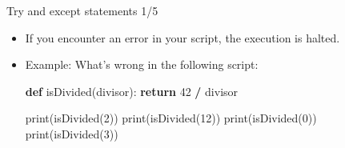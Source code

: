 \documentclass[
  8pt,
  ignorenonframetext,
]{beamer}
\newenvironment{Shaded}{\begin{snugshade}}{\end{snugshade}}
\newcommand{\BuiltInTok}[1]{#1}
\newcommand{\ControlFlowTok}[1]{\textcolor[rgb]{0.13,0.29,0.53}{\textbf{#1}}}
\newcommand{\DecValTok}[1]{\textcolor[rgb]{0.00,0.00,0.81}{#1}}
\newcommand{\KeywordTok}[1]{\textcolor[rgb]{0.13,0.29,0.53}{\textbf{#1}}}
\newcommand{\NormalTok}[1]{#1}
\newcommand{\OperatorTok}[1]{\textcolor[rgb]{0.81,0.36,0.00}{\textbf{#1}}}
\providecommand{\tightlist}{%
  \setlength{\itemsep}{0pt}\setlength{\parskip}{0pt}}
\begin{document}
\begin{frame}[fragile]{Try and except statements 1/5}
\protect\hypertarget{try-and-except-statements-15}{}
\begin{itemize}[<+->]
\tightlist
\item
  If you encounter an error in your script, the execution is halted.
\end{itemize}

\begin{itemize}[<+->]
\item
  Example: What's wrong in the following script:

\begin{Shaded}
\begin{Highlighting}[]
\KeywordTok{def}\NormalTok{ isDivided(divisor):}
    \ControlFlowTok{return} \DecValTok{42} \OperatorTok{/}\NormalTok{ divisor}

\BuiltInTok{print}\NormalTok{(isDivided(}\DecValTok{2}\NormalTok{))}
\BuiltInTok{print}\NormalTok{(isDivided(}\DecValTok{12}\NormalTok{))}
\BuiltInTok{print}\NormalTok{(isDivided(}\DecValTok{0}\NormalTok{))}
\BuiltInTok{print}\NormalTok{(isDivided(}\DecValTok{3}\NormalTok{))}
\end{Highlighting}
\end{Shaded}
\end{itemize}
\end{frame}
\end{document}

